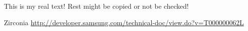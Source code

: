 This is my real text! Rest might be copied or not be checked!


Zirconia
\url{http://developer.samsung.com/technical-doc/view.do?v=T000000062L}
